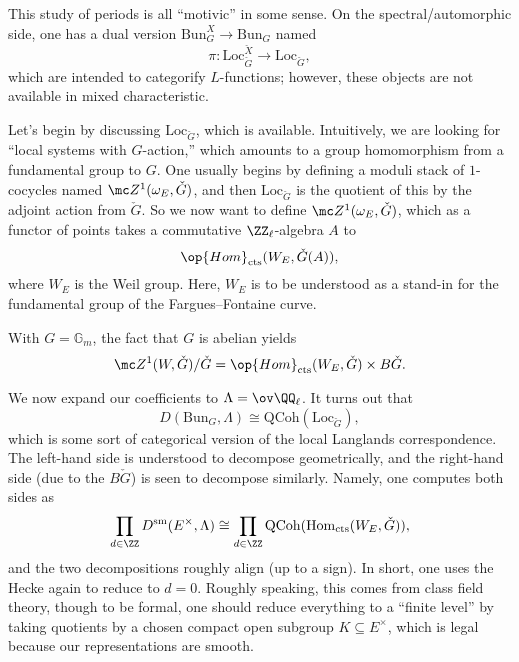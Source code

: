 \documentclass{article}
\begin{document}
This study of periods is all ``motivic'' in some sense. On the spectral/automorphic side, one has a dual version $\mathrm{Bun}_G^X\to\mathrm{Bun}_G$ named
\[\pi\colon\mathrm{Loc}_{\check G}^{\check X}\to\mathrm{Loc}_{\check G},\]
which are intended to categorify $L$-functions; however, these objects are not available in mixed characteristic.

Let's begin by discussing $\mathrm{Loc}_{\check G}$, which is available. Intuitively, we are looking for ``local systems with $G$-action,'' which amounts to a group homomorphism from a fundamental group to $G$. One usually begins by defining a moduli stack of $1$-cocycles named $\mc Z^1(\omega_E,\check G)$, and then $\mathrm{Loc}_{\check G}$ is the quotient of this by the adjoint action from $\check G$. So we now want to define $\mc Z^1(\omega_E,\check G)$, which as a functor of points takes a commutative $\ZZ_\ell$-algebra $A$ to
\[\op{Hom}_{\mathrm{cts}}(W_E,\check G(A)),\]
where $W_E$ is the Weil group. Here, $W_E$ is to be understood as a stand-in for the fundamental group of the Fargues--Fontaine curve.
\begin{example}
	With $G=\mathbb G_m$, the fact that $G$ is abelian yields
	\[\mc Z^1(W,\check G)/\check G=\op{Hom}_{\mathrm{cts}}(W_E,\check G)\times B\check G.\]
\end{example}
We now expand our coefficients to $\Lambda=\ov\QQ_\ell$. It turns out that
\[D(\mathrm{Bun}_G,\Lambda)\cong\mathrm{QCoh}(\mathrm{Loc}_{\check G}),\]
which is some sort of categorical version of the local Langlands correspondence. The left-hand side is understood to decompose geometrically, and the right-hand side (due to the $B\check G$) is seen to decompose similarly. Namely, one computes both sides as
\[\prod_{d\in\ZZ}D^{\mathrm{sm}}(E^\times,\Lambda)\cong\prod_{d\in\ZZ}\mathrm{QCoh}(\mathrm{Hom}_{\mathrm{cts}}(W_E,\check G)),\]
and the two decompositions roughly align (up to a sign). In short, one uses the Hecke again to reduce to $d=0$. Roughly speaking, this comes from class field theory, though to be formal, one should reduce everything to a ``finite level'' by taking quotients by a chosen compact open subgroup $K\subseteq E^\times$, which is legal because our representations are smooth.
\end{document}
